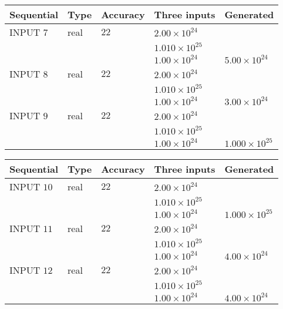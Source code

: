 \documentclass[12pt]{article}
\begin{document}
   
  
  
\noindent\begin{tabular}{|l|l|l|l|l|}
\hline
 Sequential & Type & Accuracy & Three inputs & Generated \\ 
\hline
 
 
  INPUT $            7 $ & real & $           22  $ & $
 2.00 \times 10^{24}
  $ & \\
  & & &  $
 1.010 \times 10^{25}
  $ & \\
  & & &  $
 1.00 \times 10^{24}
 $ & $ 5.00 \times 10^{24} $ 
 \\  \hline  
 
 
  INPUT $            8 $ & real & $           22  $ & $
 2.00 \times 10^{24}
  $ & \\
  & & &  $
 1.010 \times 10^{25}
  $ & \\
  & & &  $
 1.00 \times 10^{24}
 $ & $ 3.00 \times 10^{24} $ 
 \\  \hline  
 
 
  INPUT $            9 $ & real & $           22  $ & $
 2.00 \times 10^{24}
  $ & \\
  & & &  $
 1.010 \times 10^{25}
  $ & \\
  & & &  $
 1.00 \times 10^{24}
 $ & $ 1.000 \times 10^{25} $ 
 \\  \hline  
 \end{tabular}
   
   
  
  
\noindent\begin{tabular}{|l|l|l|l|l|}
\hline
 Sequential & Type & Accuracy & Three inputs & Generated \\ 
\hline
 
 
  INPUT $           10 $ & real & $           22  $ & $
 2.00 \times 10^{24}
  $ & \\
  & & &  $
 1.010 \times 10^{25}
  $ & \\
  & & &  $
 1.00 \times 10^{24}
 $ & $ 1.000 \times 10^{25} $ 
 \\  \hline  
 
 
  INPUT $           11 $ & real & $           22  $ & $
 2.00 \times 10^{24}
  $ & \\
  & & &  $
 1.010 \times 10^{25}
  $ & \\
  & & &  $
 1.00 \times 10^{24}
 $ & $ 4.00 \times 10^{24} $ 
 \\  \hline  
 
 
  INPUT $           12 $ & real & $           22  $ & $
 2.00 \times 10^{24}
  $ & \\
  & & &  $
 1.010 \times 10^{25}
  $ & \\
  & & &  $
 1.00 \times 10^{24}
 $ & $ 4.00 \times 10^{24} $ 
 \\  \hline  
 \end{tabular}
   
\end{document}
